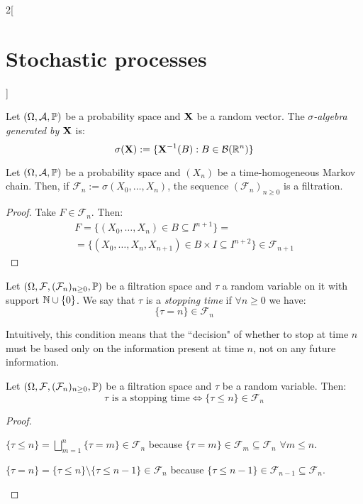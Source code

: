 \documentclass[../../../main_math.tex]{subfiles}
\begin{document}
\begin{multicols}{2}[\section{Stochastic processes}]
\begin{definition}
  \end{definition}
  \begin{definition}
    Let $(\Omega,\mathcal{A},\mathbb{P})$ be a probability space and $\boldsymbol{\mathrm{X}}$ be a random vector. The \emph{$\sigma$-algebra generated by $\boldsymbol{\mathrm{X}}$} is:
    $$\sigma(\boldsymbol{\mathrm{X}}):=\{\boldsymbol{\mathrm{X}}^{-1}(B):B\in\mathcal{B}(\mathbb{R}^n)\}$$
  \end{definition}
  \begin{proposition}
    Let $(\Omega,\mathcal{A},\mathbb{P})$ be a probability space and $(X_n)$ be a time-homogeneous Markov chain. Then, if $\mathcal{F}_n:=\sigma(X_0,\ldots,X_n)$, the sequence $(\mathcal{F}_n)_{n\geq 0}$ is a filtration.
  \end{proposition}
  \begin{proof}
    Take $F\in\mathcal{F}_n$. Then:
    \begin{multline*}
      F=\{(X_0,\ldots,X_n)\in B\subseteq I^{n+1}\}=\\=\{(X_0,\ldots,X_n,X_{n+1})\in B\times I\subseteq I^{n+2}\}\in\mathcal{F}_{n+1}
    \end{multline*}
  \end{proof}
  \begin{definition}
    Let $(\Omega,\mathcal{F},(\mathcal{F}_n)_{n\geq 0},\mathbb{P})$ be a filtration space and $\tau$ a random variable on it with support $\mathbb{N}\cup\{0\}$. We say that $\tau$ is a \emph{stopping time} if $\forall n\geq 0$ we have:
    $$\{\tau= n\}\in\mathcal{F}_n$$
  \end{definition}
  \begin{remark}
    Intuitively, this condition means that the ``decision" of whether to stop at time $n$ must be based only on the information present at time $n$, not on any future information.
  \end{remark}
  \begin{lemma}
    Let $(\Omega,\mathcal{F},(\mathcal{F}_n)_{n\geq 0},\mathbb{P})$ be a filtration space and $\tau$ be a random variable. Then:
    $$\tau\text{ is a stopping time}\iff\{\tau\leq n\}\in\mathcal{F}_n$$
  \end{lemma}
  \begin{proof}
    \begin{itemizeiff}
      $\displaystyle\{\tau\leq n\}=\bigsqcup_{m=1}^n\{\tau=m\}\in \mathcal{F}_n$
      because $\{\tau=m\}\in \mathcal{F}_{m}\subseteq \mathcal{F}_{n}$ $\forall m\leq n$.
      \item $\displaystyle\{\tau = n\}=\{\tau\leq n\}\setminus\{\tau\leq n-1\}\in \mathcal{F}_n$
      because $\{\tau\leq n-1\}\in \mathcal{F}_{n-1}\subseteq \mathcal{F}_{n}$.

\end{itemizeiff}
\end{proof}
\end{multicols}
\end{document}
